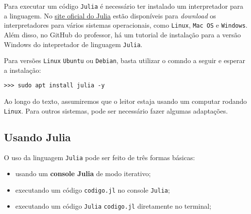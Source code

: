 Para executar um código \verb+Julia+ é necessário ter instalado um interpretador para a linguagem. No \href{https://julialang.org/downloads/}{site oficial do Julia} estão disponíveis para {\it download} os interpretadores para vários sistemas operacionais, como \verb+Linux+, \verb+Mac OS+ e \verb+Windows+. Além disso, no GitHub do professor, há um tutorial de instalação para a versão Windows do intepretador de linguagem \verb+Julia+.

Para versões \verb+Linux+ \verb+Ubuntu+ ou \verb+Debian+, basta utilizar o comndo a seguir e esperar a instalação:
\begin{lstlisting}
>>> sudo apt install julia -y
\end{lstlisting}

Ao longo do texto, assumiremos que o leitor estaja usando um computar rodando \verb+Linux+. Para outros sistemas, pode ser necessário fazer algumas adaptações.

\subsection{Usando Julia}

O uso da linguagem \verb+Julia+ pode ser feito de três formas básicas:

\begin{itemize}
\item usando um {\bf console Julia} de modo iterativo;
\item executando um código \verb+codigo.jl+ no console \verb+Julia+;
\item executando um código \verb+Julia+ \verb+codigo.jl+ diretamente no terminal;
\end{itemize}

